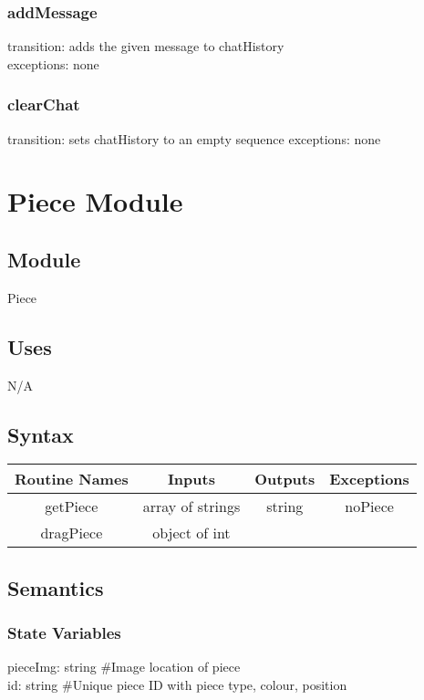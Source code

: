 \documentclass{article}
\begin{document}
        \subsubsection*{addMessage} 
            transition: adds the given message to chatHistory \\
            exceptions: none
        
        \subsubsection*{clearChat} 
            transition: sets chatHistory to an empty sequence
            exceptions: none

\newpage
\section*{Piece Module}
    \subsection*{Module}
        Piece
    
    \subsection*{Uses}
        N/A
    
    \subsection*{Syntax}
        \begin{center}
            \begin{tabular}{|c|c|c|c|} 
                \hline
                Routine Names & Inputs & Outputs & Exceptions \\
                \hline
                getPiece & array of strings & string & noPiece \\ 
                \hline
                dragPiece & object of int &  & \\ 
                \hline
            \end{tabular}
        \end{center}
    
    \subsection*{Semantics}
        \subsubsection*{State Variables}
            pieceImg: string \#Image location of piece\\
            id: string \#Unique piece ID with piece type, colour, position
\end{document}
